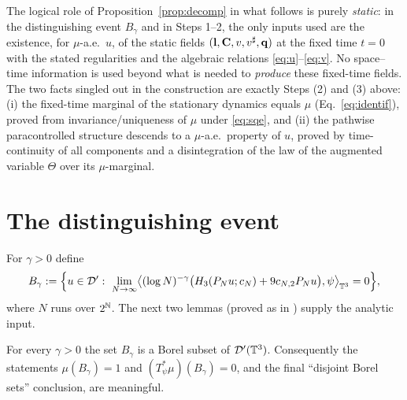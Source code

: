 \begin{remark}\label{rem:descent}
The logical role of Proposition~\ref{prop:decomp} in what follows is purely
\emph{static}: in the distinguishing event $B_\gamma$ and in Steps 1--2, the only
inputs used are the existence, for $\mu$-a.e.\ $u$, of the static fields
$(\mathbf{l},\mathbf{C},v,v^\sharp,\mathbf{q})$ at the fixed time $t=0$ with the stated
regularities and the algebraic relations \eqref{eq:u}--\eqref{eq:v}. No
space--time information is used beyond what is needed to \emph{produce} these
fixed-time fields. The two facts singled out in the construction are exactly Steps
(2) and (3) above: (i) the fixed-time marginal of the stationary dynamics equals
$\mu$ (Eq.~\eqref{eq:identif}), proved from invariance/uniqueness of $\mu$ under
\eqref{eq:sqe}, and (ii) the pathwise paracontrolled structure descends to a
$\mu$-a.e.\ property of $u$, proved by time-continuity of all components and a
disintegration of the law of the augmented variable $\Theta$ over its $\mu$-marginal.
\end{remark}

\section*{The distinguishing event}

For $\gamma>0$ define
\[
B_\gamma:=\Bigl\{u\in\qoneD':\ \lim_{N\to\infty}\bigl\langle(\log N)^{-\gamma}\bigl(\qoneHp_3(\qonePN u;c_N)+9c_{N,2}\qonePN u\bigr),\psi\bigr\rangle_{\qoneT^3}=0\Bigr\},
\]
where $N$ runs over $2^{\mathbb{N}}$. The next two lemmas (proved as in
\cite[Lems.~3.11--3.12]{HKN24}) supply the analytic input.

\begin{qonelemma}[Measurability]\label{lem:borel}
For every $\gamma>0$ the set $B_\gamma$ is a Borel subset of $\mathcal{D}'(\mathbb{T}^3)$.
Consequently the statements $\mu(B_\gamma)=1$ and $(T_\psi^*\mu)(B_\gamma)=0$, and
the final ``disjoint Borel sets'' conclusion, are meaningful.
\end{qonelemma}

